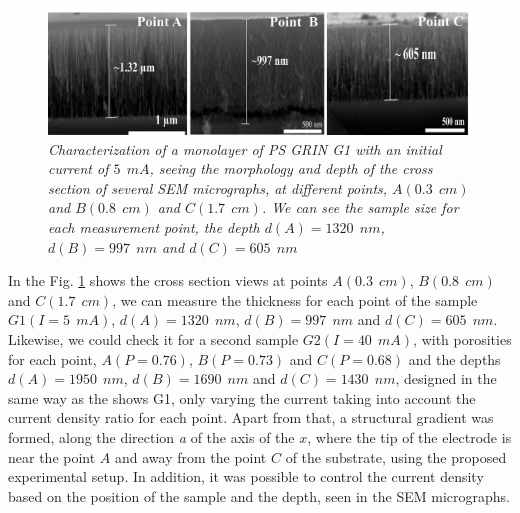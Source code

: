\documentclass{article}
\begin{document}
\begin{figure}
  \centering
  \includegraphics[scale=.5]{Images/semD11}
  \caption{\emph{Characterization of a monolayer of PS GRIN G1
      with an initial current of $ 5 \ \ mA $, seeing the
      morphology and depth of the cross section of several SEM
      micrographs, at different points, $ A (0.3 \ \ cm) $ and $
      B (0.8 \ \ cm) $ and $ C (1.7 \ \ cm) $. We can see the
      sample size for each measurement point, the depth $ d (A)
      = 1320 \ \ nm $, $ d (B) = 997 \ \ nm $ and $ d (C) = 605
      \ \ nm $ } }
  \label{fig:DR4}
\end{figure}
In the Fig. \ref{fig:DR4} shows the cross section views   at points $
A (0.3 \ \ cm) $, $ B (0.8 \ \ cm) $ and $ C (1.7 \ \ cm) $, we can
measure the thickness for each point of the sample $ G1 (I = 5 \ \ mA)
$, $ d (A) = 1320 \ \ nm $, $ d (B) = 997 \ \ nm $ and $ d (C) = 605 \
\ nm $. Likewise, we could check it for a second sample $ G2 (I = 40 \
\ mA) $, with porosities for each point, $ A (P = 0.76) $, $ B (P =
0.73) $ and $ C (P = 0.68) $ and the depths $ d (A) = 1950 \ \ nm $, $
d (B) = 1690 \ \ nm $ and $ d (C) = 1430 \ \ nm $, designed in the
same way as the shows G1, only varying the current taking into account
the current density ratio for each point. Apart from that, a
structural gradient was formed, along the direction \emph{ a}  of the
axis of the $ x $, where the tip of the electrode is near the point $
A $ and away from the point $ C $ of the substrate, using the proposed
experimental setup. In addition, it was possible to control the
current density based on the position of the sample and the depth,
seen in the SEM micrographs.
\end{document}
